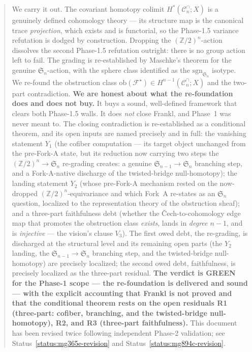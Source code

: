 \documentclass[11pt,oneside]{amsart}
\theoremstyle{plain}
\theoremstyle{definition}
\theoremstyle{remark}
\theoremstyle{honeststyle}
\newcommand{\F}{\mathcal{F}}
\newcommand{\Fstar}{\F^{\star}}
\newcommand{\sgn}{\mathrm{sgn}}
\newcommand{\Sym}{\mathfrak{S}}
\newcommand{\Z}{\mathbb{Z}}
\newcommand{\Cn}{\mathcal{C}^{\cap}_n}
\newcommand{\ob}{\mathrm{ob}}
\begin{document}
\begin{abstract}
We carry it out. The covariant homotopy colimit $H^{*}(\Cn;X)$ is a
genuinely defined cohomology theory --- its structure map is the
canonical trace \emph{projection}, which exists and is functorial, so
the Phase-1.5 variance refutation is dodged by construction. Dropping
the $(\Z/2)^n$-action dissolves the second Phase-1.5 refutation
outright: there is no group action left to fail. The grading is
re-established by Maschke's theorem for the genuine $\Sym_n$-action,
with the sphere class identified as the $\sgn_{\Sym_n}$ isotype. We
re-found the obstruction class $\ob(\Fstar)\in H^{n-1}(\Cn;X)$ and the
two-part contradiction. \textbf{We are honest about what the
re-foundation does and does not buy.} It buys a sound, well-defined
framework that clears both Phase-1.5 walls. It does \emph{not} close
Frankl, and Phase~1 was never meant to. The closing contradiction is
re-established as a conditional theorem, and its open inputs are named
precisely and in full: the vanishing statement $Y_1$ (the cofiber
computation --- its target object unchanged from the pre-Fork-A state,
but its reduction now carrying two steps the $(\Z/2)^n\to\Sym_n$
re-grading creates: a genuine $\Sym_{n-1}\to\Sym_n$ branching step,
and a Fork-A-native discharge of the twisted-bridge null-homotopy);
the landing statement $Y_2$ (whose pre-Fork-A mechanism rested on the
now-dropped $(\Z/2)^n$-equivariance and which Fork~A re-states as an
$\Sym_n$ question, localized to the representation theory of the
obstruction sheaf); and a three-part faithfulness debt (whether the
\v{C}ech-to-cohomology edge map that promotes the obstruction class
\emph{exists}, lands in \emph{degree $n-1$}, and is \emph{injective}
--- the vision's clause $V_3$). The first owed debt, the re-grading, is
discharged at the structural level and its remaining open parts (the
$Y_2$ landing, the $\Sym_{n-1}\to\Sym_n$ branching step, and the
twisted-bridge null-homotopy) are precisely localized; the second owed
debt, faithfulness, is precisely localized as the three-part residual.
\textbf{The verdict is GREEN for the Phase-1 scope --- the
re-foundation is delivered and sound --- with the explicit accounting
that Frankl is not proved and that the conditional theorem rests on
the open residuals R1 (three-part: cofiber, branching, and the
twisted-bridge null-homotopy), R2, and R3 (three-part
faithfulness).} This document has been revised twice following
independent Phase-2 validation; see
Status~\ref{status:mg365e-revision} and
Status~\ref{status:mg894c-revision}.
\end{abstract}
\end{document}
